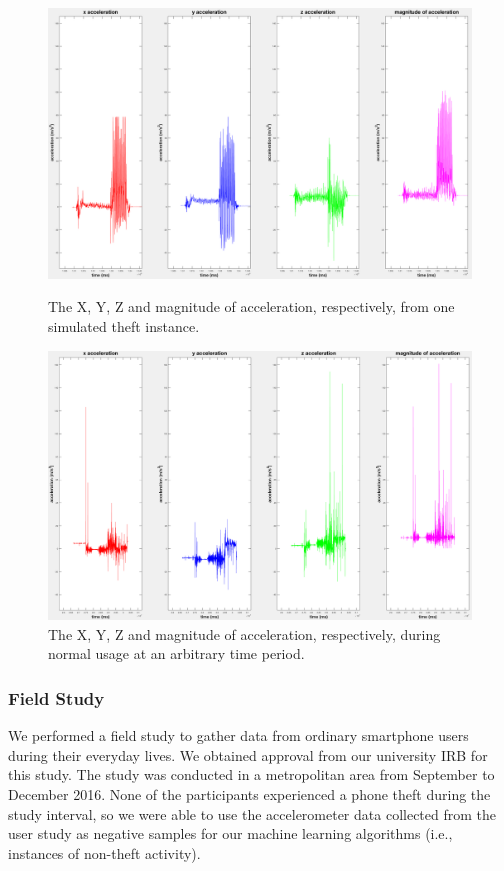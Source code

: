 \begin{figure}[t]
\includegraphics[width=1.0\columnwidth]{pos_acc_separated.png}
\caption{The X, Y, Z and magnitude of acceleration, respectively, from one simulated theft instance.}
\label{fig:simtheft}
\includegraphics[width=1.0\columnwidth]{neg_acc_separated.png}
\caption{The X, Y, Z and magnitude of acceleration, respectively, during normal usage at an arbitrary time period.}
\end{figure}




\subsubsection{Field Study}
We performed a field study to gather data from ordinary smartphone users
during their everyday lives.
We obtained approval from our university IRB for this study. 
The study was conducted in a metropolitan area from September to December 2016.
None of the participants experienced a phone theft during the study interval,
so we were able to use the accelerometer data collected from the user study as negative samples for our machine learning algorithms (i.e., instances of non-theft activity).

